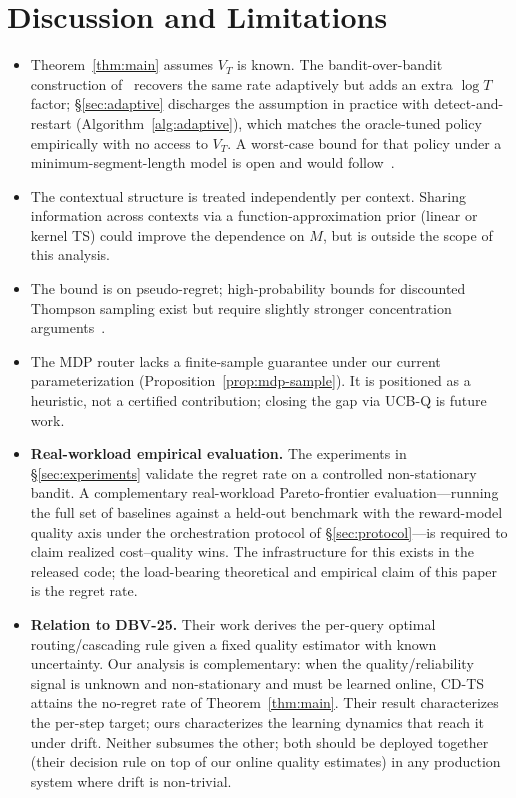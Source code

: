 \documentclass[11pt]{article}
\theoremstyle{definition}
\begin{document}
\section{Discussion and Limitations}
\label{sec:limitations}

\begin{itemize}[leftmargin=*, itemsep=1pt, topsep=2pt]
\item Theorem~\ref{thm:main} assumes $V_T$ is known. The
bandit-over-bandit construction of~\cite{cheung2019learning} recovers the
same rate adaptively but adds an extra $\log T$ factor; \S\ref{sec:adaptive}
discharges the assumption in practice with detect-and-restart
(Algorithm~\ref{alg:adaptive}), which matches the oracle-tuned policy
empirically with no access to $V_T$. A worst-case bound for that policy under
a minimum-segment-length model is open and would follow~\cite{liu2018change,cao2019nearly}.
\item The contextual structure is treated independently per context.
Sharing information across contexts via a function-approximation prior
(linear or kernel TS) could improve the dependence on $M$, but is
outside the scope of this analysis.
\item The bound is on pseudo-regret; high-probability bounds for
discounted Thompson sampling exist but require slightly stronger
concentration arguments~\cite{russac2019weighted}.
\item The MDP router lacks a finite-sample guarantee under our current
parameterization (Proposition~\ref{prop:mdp-sample}). It is positioned
as a heuristic, not a certified contribution; closing the gap via
\textsc{UCB-Q} is future work.
\item \textbf{Real-workload empirical evaluation.} The experiments
in \S\ref{sec:experiments} validate the regret rate on a controlled
non-stationary bandit. A complementary real-workload Pareto-frontier
evaluation---running the full set of baselines against a held-out
benchmark with the reward-model quality axis under the orchestration
protocol of \S\ref{sec:protocol}---is required to claim realized
cost--quality wins. The infrastructure for this exists in the released
code; the load-bearing theoretical and empirical claim of this paper is
the regret rate.
\item \textbf{Relation to DBV-25.} Their work derives the per-query
optimal routing/cascading rule given a fixed quality estimator with known
uncertainty. Our analysis is complementary: when the
quality/reliability signal is unknown and non-stationary and must be
learned online, CD-TS attains the no-regret rate of
Theorem~\ref{thm:main}. Their result characterizes the per-step target;
ours characterizes the learning dynamics that reach it under drift.
Neither subsumes the other; both should be deployed together (their
decision rule on top of our online quality estimates) in any production
system where drift is non-trivial.
\end{itemize}
\end{document}
